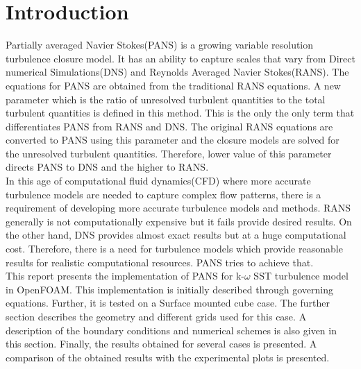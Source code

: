 \chapter{Introduction}
\hspace{0.25cm}Partially averaged Navier Stokes(PANS) is a growing variable resolution turbulence closure model. It has an ability to capture scales that vary from Direct numerical Simulations(DNS) and Reynolds Averaged Navier Stokes(RANS). The equations for PANS are obtained from the traditional RANS equations. A new parameter which is the ratio of unresolved turbulent quantities to the total turbulent quantities is defined in this method. This is the only the only term that differentiates PANS from RANS and DNS. The original RANS equations are converted to PANS using this parameter and the closure models are solved for the unresolved turbulent quantities. Therefore, lower value of this parameter directs PANS to DNS and the higher to RANS.\\


\hspace{0.25cm}In this age of computational fluid dynamics(CFD) where more accurate turbulence models are needed to capture complex flow patterns, there is a requirement of developing more accurate turbulence models and methods. RANS generally is not computationally expensive but it fails provide desired results. On the other hand, DNS provides almost exact results but at a huge computational cost. Therefore, there is a need for turbulence models which provide reasonable results for realistic computational resources. PANS tries to achieve that\cite{giri}.\\



\hspace{0.25cm}This report presents the implementation of PANS for k-$\omega$ SST turbulence model in OpenFOAM. This implementation is initially described through governing equations. Further, it is tested on a Surface mounted cube case. The further section describes the geometry and different grids used for this case. A description of the boundary conditions and numerical schemes is also given in this section. Finally, the results obtained for several cases is presented. A comparison of the obtained results with the experimental plots is presented.


